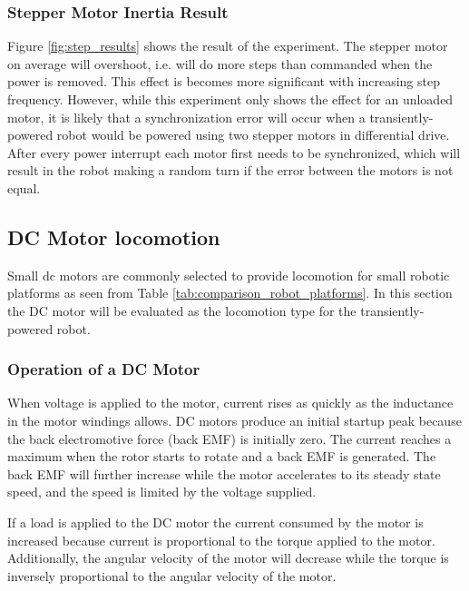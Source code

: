 

\subsubsection{Stepper Motor Inertia Result}

Figure \ref{fig:step_results} shows the result of the experiment.
The stepper motor on average will overshoot, i.e. will do more steps than commanded when the power is removed.
This effect is becomes more significant with increasing step frequency.
However, while this experiment only shows the effect for an unloaded motor, it is likely that a synchronization error will occur when a transiently-powered robot would be powered using two stepper motors in differential drive.
After every power interrupt each motor first needs to be synchronized, which will result in the robot making a random turn if the error between the motors is not equal.

\subsection{DC Motor locomotion}
\label{sec:pre_dc_motor_locomotion}
Small dc motors are commonly selected to provide locomotion for small robotic platforms as seen from Table \ref{tab:comparison_robot_platforms}.
In this section the DC motor will be evaluated as the locomotion type for the transiently-powered robot.

\subsubsection{Operation of a DC Motor}

When voltage is applied to the motor, current rises as quickly as the inductance in the motor windings allows.
DC motors produce an initial startup peak because the back electromotive force (back EMF) is initially zero.
The current reaches a maximum when the rotor starts to rotate and a back EMF is generated.
The back EMF will further increase while the motor accelerates to its steady state speed, and the speed is limited by the voltage supplied.

If a load is applied to the DC motor the current consumed by the motor is increased because current is proportional to the torque applied to the motor.
Additionally, the angular velocity of the motor will decrease while the torque is inversely proportional to the angular velocity of the motor.

